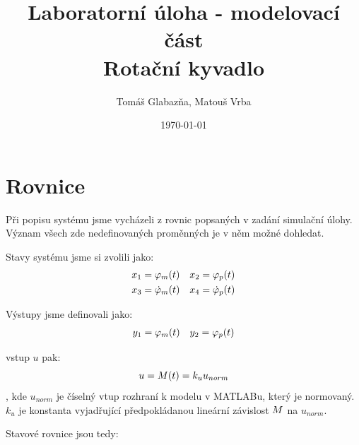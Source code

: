 \documentclass[11pt,a4paper]{article}
\title{%
  Laboratorní úloha - modelovací část\\
  \large Rotační kyvadlo}
\author{Tomáš Glabazňa, Matouš Vrba}
\date{\today}
\begin{document}
\maketitle

\clearpage





\section{Rovnice}
\renewcommand{\u}{u}
\newcommand{\x}[2][]{ %
  \ifstrequal{#1}{t} %
   	{x_{#2}(t)} %
    {x_{#2}}    %
}
\newcommand{\xd}[2][]{
  \ifstrequal{#1}{t} 
   	{\dot{x}_{#2}(t)}
    {\dot{x}_{#2}}
}
\newcommand{\y}[1]{y_{#1}}
\newcommand{\M}[1][]{
	\ifstrequal{#1}{t}
	{M(t)}
	{M}
}
\newcommand{\ku}{k_{u}}
\newcommand{\un}{u_{norm}}
\newcommand{\phid}[2][]{
	\ifstrequal{#1}{t}
	{\dot{\varphi}_{#2}(t)}
	{\dot{\varphi}_{#2}}
	}
\newcommand{\phidd}[1]{\ddot{\varphi}_{#1}}
\newcommand{\phin}[2][]{ %
	\ifstrequal{#1}{t}	
	{\varphi_{#2}(t)}
	{\varphi_{#2}}
	}
\newcommand{\coss}[1]{\cos{(#1)}}
\newcommand{\sinn}[1]{\sin{(#1)}}
\newcommand{\sinnN}[1]{\sin^2{(#1)}} %

Při popisu systému jsme vycházeli z rovnic popsaných v zadání simulační úlohy. Význam všech zde nedefinovaných proměnných je v něm možné dohledat.

Stavy systému jsme si zvolili jako:
\begin{align*}
& \x{1} = \phin[t]{m}		 && 		\x{2} = \phin[t]{p} \\
& \x{3} = \phid[t]{m}		 &&		\x{4} = \phid[t]{p} \\
\end{align*}

Výstupy jsme definovali jako:
\begin{align*}
& \y{1} = \phin[t]{m}		 &&		\y{2} = \phin[t]{p} \\
\end{align*}

vstup $\u$ pak:
$$
\u = \M[t] = \ku \un
$$
, kde $\un$ je číselný vtup rozhraní k modelu v MATLABu, který je normovaný. $k_u$ je konstanta vyjadřující předpokládanou lineární závislost $\M$ na $\un$.

Stavové rovnice jsou tedy:
\end{document}
